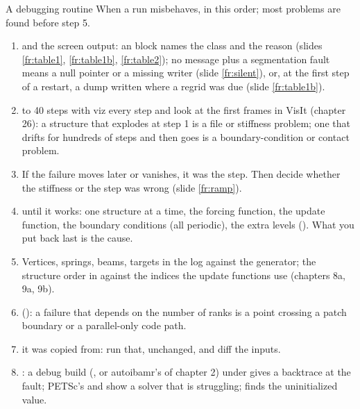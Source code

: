 \documentclass[aspectratio=169,11pt]{beamer}
\begin{document}
\begin{frame}{A debugging routine}
\label{fr:routine}
\vspace{-1.5mm}
\footnotesize When a run misbehaves, in this order; most problems are found before step 5.
\begin{enumerate}\footnotesize\setlength{\itemsep}{0pt}
  \item {} and the screen output: an  block names the class and the reason (slides \ref{fr:table1}, \ref{fr:table1b}, \ref{fr:table2}); no message plus a segmentation fault means a null pointer or a missing writer (slide \ref{fr:silent}), or, at the first step of a restart, a dump written where a regrid was due (slide \ref{fr:table1b}).
  \item {} to 40 steps with viz every step and look at the first frames in VisIt (chapter 26): a structure that explodes at step 1 is a file or stiffness problem; one that drifts for hundreds of steps and then goes is a boundary-condition or contact problem.
  \item {} If the failure moves later or vanishes, it was the step. Then decide whether the stiffness or the step was wrong (slide \ref{fr:ramp}).
  \item {} until it works: one structure at a time, the forcing function, the update function, the boundary conditions (all periodic), the extra levels (). What you put back last is the cause.
  \item {} Vertices, springs, beams, targets in the log against the generator; the structure order in  against the indices the update functions use (chapters 8a, 9a, 9b).
  \item {} (): a failure that depends on the number of ranks is a point crossing a patch boundary or a parallel-only code path.
  \item {} it was copied from: run that, unchanged, and diff the inputs.
  \item {}: a debug build (, or autoibamr's  of chapter 2) under  gives a backtrace at the fault; PETSc's  and  show a solver that is struggling;  finds the uninitialized value.
\end{enumerate}
\end{frame}
\end{document}
